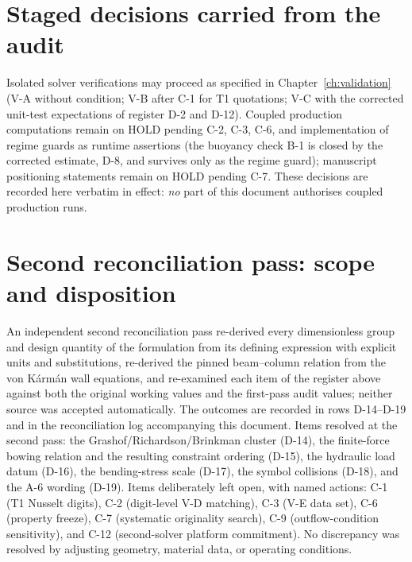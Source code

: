 \section{Staged decisions carried from the audit}
Isolated solver verifications may proceed as specified in Chapter~\ref{ch:validation} (V-A without
condition; V-B after C-1 for T1 quotations; V-C with the corrected unit-test expectations of
register D-2 and D-12). Coupled production computations remain on HOLD pending C-2, C-3,
C-6, and implementation of regime guards as runtime assertions (the buoyancy check B-1 is closed
by the corrected estimate, D-8, and survives only as the regime guard); manuscript positioning
statements remain on HOLD pending C-7. These decisions are recorded here verbatim in effect: \emph{no} part
of this document authorises coupled production runs.

\section{Second reconciliation pass: scope and disposition}
\label{sec:secondpass}
An independent second reconciliation pass re-derived every dimensionless group and design
quantity of the formulation from its defining expression with explicit units and substitutions,
re-derived the pinned beam--column relation from the von K\'arm\'an wall equations, and
re-examined each item of the register above against both the original working values and the
first-pass audit values; neither source was accepted automatically. The outcomes are recorded in
rows D-14--D-19 and in the reconciliation log accompanying this document. Items resolved at the
second pass: the Grashof/Richardson/Brinkman cluster (D-14), the finite-force bowing relation and
the resulting constraint ordering (D-15), the hydraulic load datum (D-16), the bending-stress
scale (D-17), the symbol collisions (D-18), and the A-6 wording (D-19). Items deliberately left
open, with named actions: C-1 (T1 Nusselt digits), C-2 (digit-level V-D matching), C-3 (V-E data
set), C-6 (property freeze), C-7 (systematic originality search), C-9 (outflow-condition
sensitivity), and C-12 (second-solver platform commitment). No discrepancy was resolved by
adjusting geometry, material data, or operating conditions.

